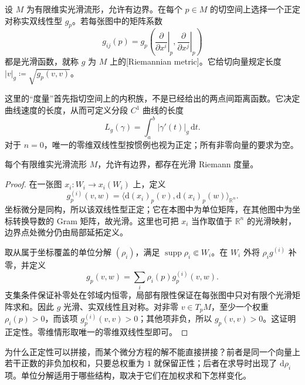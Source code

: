 \begin{definition}[Riemann 度量]\label{b1:def:E-riemannian-metric}
设 \(M\) 为有限维实光滑流形，允许有边界。在每个 \(p\in M\) 的切空间上选择一个正定对称实双线性型 \(g_p\)。若每张图中的矩阵系数
\[
 g_{ij}(p)=g_p\left(
 \left.\frac{\partial}{\partial x^i}\right|_p,
 \left.\frac{\partial}{\partial x^j}\right|_p\right)
\]
都是光滑函数，就称 \(g\) 为 \(M\) 上的[Riemannian metric]。它给切向量规定长度 \(|v|_g\coloneqq\sqrt{g_p(v,v)}\)。
\end{definition}

这里的“度量”首先指切空间上的内积族，不是已经给出的两点间距离函数。它决定曲线速度的长度，从而可定义分段 \(C^1\) 曲线的长度
\[
 L_g(\gamma)=\int_a^b|\gamma'(t)|_g\,\mathrm{d}t.
\]
对于 \(n=0\)，唯一的零维双线性型按惯例也视为正定；所有非零向量的要求为空。

\begin{theorem}\label{b1:thm:E-riemannian-metric}
每个有限维实光滑流形 \(M\)，允许有边界，都存在光滑 Riemann 度量。
\end{theorem}
\begin{proof}
在一张图 \(x_i:W_i\rightarrow x_i(W_i)\) 上，定义
\[
 g^{(i)}_p(v,w)
 =\langle\mathrm{d}(x_i)_p(v),\mathrm{d}(x_i)_p(w)\rangle_{\mathbb R^n}.
\]
坐标微分是同构，所以该双线性型正定；它在本图中为单位矩阵，在其他图中为坐标转换导数的 Gram 矩阵，故光滑。这里也可把 \(x_i\) 当作取值于 \(\mathbb R^n\) 的光滑映射，边界点处微分仍由局部延拓定义。

取从属于坐标覆盖的单位分解 \((\rho_i)\)，满足 \(\operatorname{supp}\rho_i\Subset W_i\)。在 \(W_i\) 外将 \(\rho_i g^{(i)}\) 补零，并定义
\[
 g_p(v,w)=\sum_i\rho_i(p)g^{(i)}_p(v,w).
\]
支集条件保证补零处在邻域内恒零，局部有限性保证在每张图中只对有限个光滑矩阵求和。因此 \(g\) 光滑、实双线性且对称。对非零 \(v\in T_pM\)，至少一个权重 \(\rho_i(p)>0\)，而该项 \(g^{(i)}_p(v,v)>0\)；其他项非负，所以 \(g_p(v,v)>0\)。这证明正定性。零维情形取唯一的零维双线性型即可。
\end{proof}

为什么正定性可以拼接，而某个微分方程的解不能直接拼接？前者是同一个向量上若干正数的非负加权和，只要总权重为 \(1\) 就保留正性；后者在求导时出现了 \(\mathrm{d}\rho_i\) 项。单位分解适用于哪些结构，取决于它们在加权求和下怎样变化。

